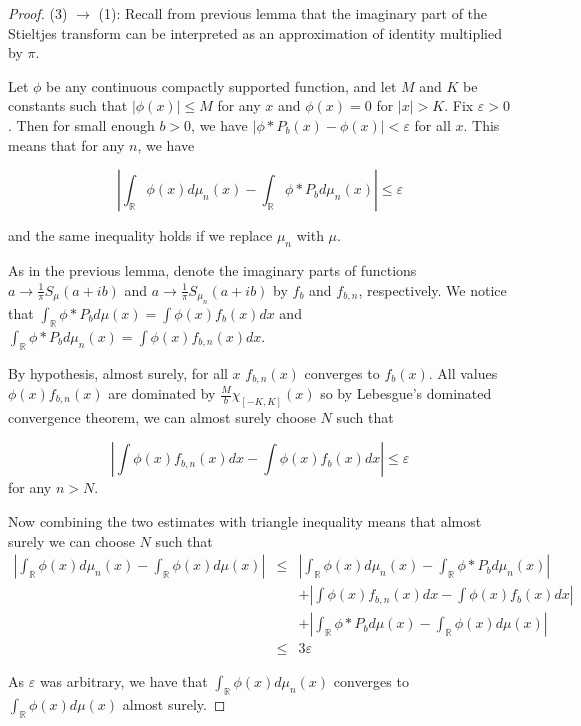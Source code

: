 \documentclass[12pt,a4paper,leqno]{report}
\newcommand{\R}{\mathbb{R}}
\newcommand{\eps}{\varepsilon}
\theoremstyle{plain}
\theoremstyle{definition}
\theoremstyle{remark}
\begin{document}
\begin{proof}
(3) $\rightarrow$ (1): Recall from previous lemma that the imaginary part of the Stieltjes transform can be interpreted as an approximation of identity multiplied by $\pi$.

Let $\phi$ be any continuous compactly supported function, and let $M$ and $K$ be constants such that $|\phi(x)|\leq M$ for any $x$ and $\phi(x)=0$ for $|x|>K$. Fix $\eps > 0$. 
Then for small enough $b>0$, we have $|\phi * P_b (x)-\phi(x)| < \eps$ for all $x$. This means that for any $n$, we have 

\begin{equation*}
|\int_{\R} \phi(x) d\mu_n(x) - \int_{\R} \phi * P_b d\mu_n(x)| \leq \eps
\end{equation*} 

and the same inequality holds if we replace $\mu_n$ with $\mu$.

As in the previous lemma, denote the imaginary parts of functions $a  \to \frac{1}{\pi} S_{\mu}(a+ib)$ and $a  \to \frac{1}{\pi} S_{\mu_n}(a+ib)$ by $f_b$ and $f_{b,n}$, respectively.  We notice that $\int_{\R} \phi * P_b d\mu(x) = \int \phi(x) f_{b}(x) dx$ and $\int_{\R} \phi * P_b d\mu_n(x) = \int \phi(x) f_{b,n}(x) dx$.

By hypothesis, almost surely, for all $x$ $f_{b,n}(x)$ converges to $f_b(x)$. All values $\phi(x) f_{b,n}(x)$ are dominated by $\frac{M}{b} \chi_{[-K,K]} (x)$ so by Lebesgue's dominated convergence theorem, we can almost surely choose $N$ such that

\begin{equation*}
|\int \phi(x) f_{b,n}(x) dx - \int \phi(x) f_{b}(x) dx| \leq \eps 
\end{equation*}
for any $n>N$.

Now combining the two estimates with triangle inequality means that almost surely we can choose $N$ such that
\begin{eqnarray*}
|\int_{\R} \phi(x) d\mu_n(x) - \int_{\R} \phi(x) d\mu(x)| & \leq &
|\int_{\R} \phi(x) d\mu_n(x) - \int_{\R} \phi * P_b d\mu_n(x)|\\
&  & + |\int \phi(x) f_{b,n}(x) dx - \int \phi(x) f_{b}(x) dx|\\
& & + | \int_{\R} \phi * P_b d\mu(x)- \int_{\R} \phi(x) d\mu(x)|\\
& \leq & 3\eps
\end{eqnarray*}

As $\eps$ was arbitrary, we have that 
$\int_{\R} \phi(x) d\mu_n(x)$ converges to $\int_{\R} \phi(x) d\mu(x)$ almost surely.
\end{proof}
\end{document}
